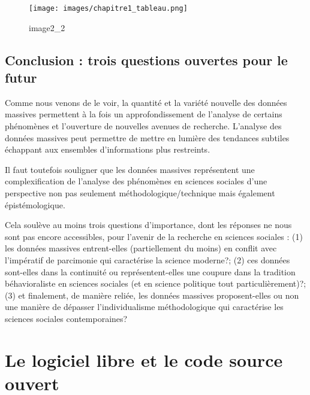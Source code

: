 \documentclass[
  letterpaper,
  DIV=11,
  numbers=noendperiod]{scrreprt}
\begin{document}
\begin{figure}[H]

{\centering \texttt{[image: images/chapitre1\_tableau.png]}

}

\caption{image2\_2}

\end{figure}%

\section*{Conclusion : trois questions ouvertes pour le
futur}\label{conclusion-trois-questions-ouvertes-pour-le-futur}


Comme nous venons de le voir, la quantité et la variété nouvelle des
données massives permettent à la fois un approfondissement de l'analyse
de certains phénomènes et l'ouverture de nouvelles avenues de recherche.
L'analyse des données massives peut permettre de mettre en lumière des
tendances subtiles échappant aux ensembles d'informations plus
restreints.

Il faut toutefois souligner que les données massives représentent une
complexification de l'analyse des phénomènes en sciences sociales d'une
perspective non pas seulement méthodologique/technique mais également
épistémologique.

Cela soulève au moins trois questions d'importance, dont les réponses ne
nous sont pas encore accessibles, pour l'avenir de la recherche en
sciences sociales : (1) les données massives entrent-elles
(partiellement du moins) en conflit avec l'impératif de parcimonie qui
caractérise la science moderne?; (2) ces données sont-elles dans la
continuité ou représentent-elles une coupure dans la tradition
béhavioraliste en sciences sociales (et en science politique tout
particulièrement)?; (3) et finalement, de manière reliée, les données
massives proposent-elles ou non une manière de dépasser l'individualisme
méthodologique qui caractérise les sciences sociales contemporaines?


\chapter{Le logiciel libre et le code source ouvert}\label{sec-chap1}
\end{document}
